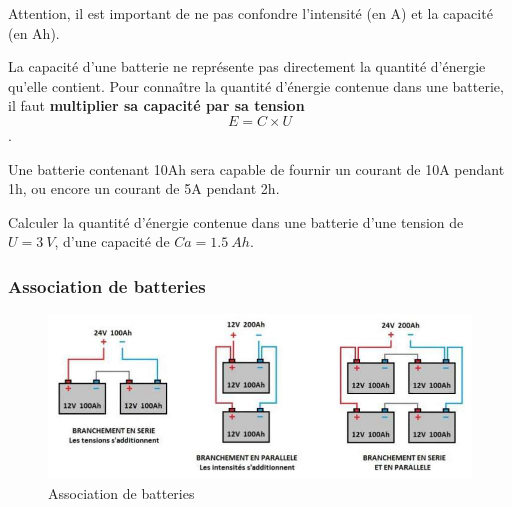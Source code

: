 \documentclass[10pt,fleqn]{article} %
\begin{document}
\begin{warn}
    Attention, il est important de ne pas confondre l'intensité (en \si{A}) et la capacité (en \si{Ah}).
\end{warn}

\begin{warn}
    La capacité d'une batterie ne représente pas directement la quantité d'énergie qu'elle contient. Pour connaître la quantité d'énergie contenue dans une batterie, il faut \textbf{multiplier sa capacité par sa tension} $$E = C \times U$$.
\end{warn}

\begin{rem}
        Une batterie contenant 10Ah sera capable de fournir un courant de 10A pendant 1h, ou encore un courant de 5A pendant 2h.
\end{rem}

\begin{exemple}
    Calculer la quantité d'énergie contenue dans une batterie d'une tension de $U = \SI{3}{V}$, d'une capacité de $Ca=\SI{1.5}{Ah}$.
\end{exemple}
\begin{correction}
\end{correction}

\subsubsection{Association de batteries}

\begin{figure}[h]
    \centering
    \includegraphics[width=\textwidth]{images/association.png}
    \caption{Association de batteries}
    \label{fig:association}
\end{figure}
\end{document}
